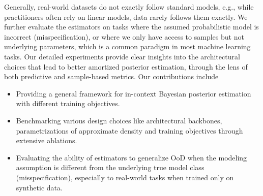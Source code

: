 Generally, real-world datasets do not exactly follow standard models, e.g., while practitioners often rely on linear models, data rarely follows them exactly. We further evaluate the estimators on tasks where the assumed probabilistic model is incorrect (misspecification), or where we only have access to samples but not underlying parameters, which is a common paradigm in most machine learning tasks.
% 
Our detailed experiments provide clear insights into the architectural choices that lead to better amortized posterior estimation, through the lens of both predictive and sample-based metrics. Our contributions include
\begin{itemize}[topsep=0pt,parsep=1pt,partopsep=0pt,leftmargin=3mm] %
  \setlength\itemsep{0pt}
    \item Providing a general framework for in-context Bayesian posterior estimation with different training objectives.
    \item Benchmarking various design choices like architectural backbones, parametrizations of approximate density and training objectives through extensive ablations.
    \item Evaluating the ability of estimators to generalize OoD when the modeling assumption is different from the underlying true model class (misspecification), especially to real-world tasks when trained only on synthetic data.
\end{itemize}